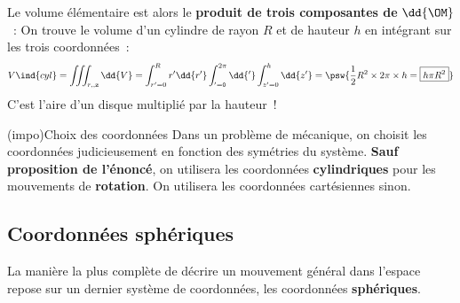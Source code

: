 \documentclass[../../main/main.tex]{subfiles}
\begin{document}
Le volume élémentaire est alors le \textbf{produit de trois composantes de}
$\dd{\OM}$~:
\psw{
	\[
		\boxed{\dd{V} = r \dd{r} \dd{\tt} \dd{z}}
	\]
}
On trouve le volume d'un cylindre de rayon $R$ et de hauteur $h$ en
intégrant sur les trois coordonnées~:
\[V\ind{cyl} = \iiint_{r,\tt,z} \dd{V} =
	\int_{r'=0}^{R} r'\dd{r'}
	\int_{\tt'=0}^{2\pi} \dd{\tt'}
	\int_{z'=0}^{h} \dd{z'} =
	\psw{
		\frac{1}{2}R^2\times 2\pi \times h = \boxed{h\pi R^2}
	}
\]
C'est l'aire d'un disque multiplié par la hauteur~!

\begin{tcb*}(impo){Choix des coordonnées}
	Dans un problème de mécanique, on choisit les coordonnées judicieusement en
	fonction des symétries du système. \textbf{Sauf proposition de l'énoncé}, on
	utilisera les coordonnées \textbf{cylindriques} pour les mouvements de
	\textbf{rotation}. On utilisera les coordonnées cartésiennes sinon.
\end{tcb*}

\subsection{Coordonnées sphériques}
La manière la plus complète de décrire un mouvement général dans l'espace repose
sur un dernier système de coordonnées, les coordonnées \textbf{sphériques}.
\end{document}
